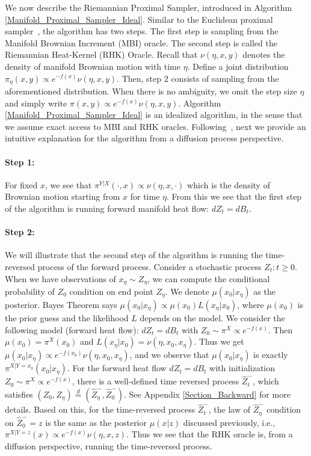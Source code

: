 We now describe the Riemannian Proximal Sampler, introduced in Algorithm \ref{Manifold_Proximal_Sampler_Ideal}. Similar to the Euclidean proximal sampler~\citep{lee2021structured}, the algorithm has two steps. The first step is sampling from the Manifold Brownian Increment (MBI) oracle. The second step is called the Riemannian Heat-Kernel (RHK) Oracle. Recall that $\nu(\eta, x, y)$ denotes the density of manifold Brownian motion with time $\eta$. Define a joint distribution $\pi_{\eta}(x, y) \propto e^{-f(x)} \nu(\eta, x, y)$. Then, step 2 consists of sampling from the aforementioned distribution. When there is no ambiguity, we omit the step size $\eta$ and simply write $\pi(x, y) \propto e^{-f(x)} \nu(\eta, x, y)$. Algorithm \ref{Manifold_Proximal_Sampler_Ideal} is an idealized algorithm, in the sense that we assume exact access to MBI and RHK oracles. Following~\cite{chen2022improved}, next we provide an intuitive explanation for the algorithm from a diffusion process perspective. 

\paragraph{Step 1:} For fixed $x$, we see that $\pi^{Y|X}(\cdot, x) \propto \nu(\eta, x, \cdot)$ which is the density of Brownian motion starting from $x$ for time $\eta$.
From this we see that the first step of the algorithm is running forward manifold heat flow: $dZ_{t} = dB_{t}$. 

\paragraph{Step 2:} We will illustrate that the second step of the algorithm is running the time-reversed process of the forward process. Consider a stochastic process $Z_{t}: t \ge 0$. 
When we have observations of $x_{\eta} \sim Z_{\eta}$, we can compute the conditional probability of $Z_{0}$ condition on end point $Z_{\eta}$. 
We denote $\mu(x_{0}|x_{\eta})$ as the posterior.
Bayes Theorem says $\mu(x_{0}|x_{\eta}) \propto \mu(x_{0}) L(x_{\eta}|x_{0})$,
where $\mu(x_{0})$ is the prior guess and the likelihood $L$ depends on the model.
We consider the following model (forward heat flow): $dZ_{t} = dB_{t}$ with $Z_{0} \sim \pi^{X} \propto e^{-f(x)}$. 
Then $\mu(x_{0}) = \pi^{X}(x_{0})$ and $L(x_{\eta}|x_{0}) = \nu(\eta, x_{0}, x_{\eta})$.
Thus we get $\mu(x_{0}|x_{\eta}) \propto e^{-f(x_{0})} \nu(\eta, x_{0}, x_{\eta})$, and we observe that $\mu(x_{0}|x_{\eta})$ is exactly $\pi^{X|Y = x_{\eta}}(x_{0}|x_{\eta})$. For the forward heat flow $dZ_{t} = dB_{t}$ with initialization $Z_{0} \sim \pi^{X} \propto e^{-f(x)}$,
there is a well-defined time reversed process $\hat{Z}_{t}^{-}$, 
which satisfies $(Z_{0}, Z_{\eta}) \overset{d}{=} (\hat{Z}_{\eta}^{-}, \hat{Z}_{0}^{-})$. See Appendix \ref{Section_Backward} for more details.
Based on this, for the time-reversed process $\hat{Z}_{t}^{-}$, 
the law of $\hat{Z}_{\eta}^{-}$ condition on $\hat{Z}_{0}^{-} = z$ is
the same as the posterior $\mu(x|z)$ discussed previously, i.e., $\pi^{X|Y = z}(x) \propto e^{-f(x)} \nu(\eta, x, z)$. 
Thus we see that the RHK oracle is, from a diffusion perspective, running the time-reversed process.

